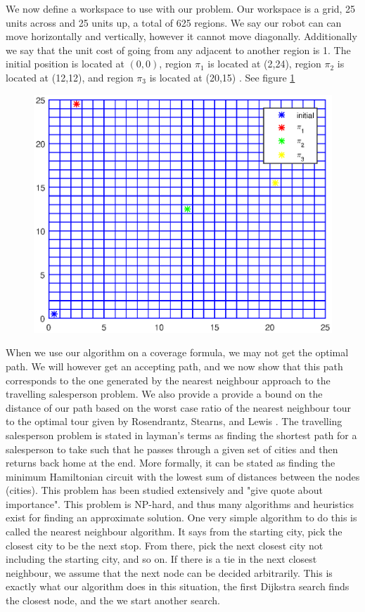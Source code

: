 We now define a workspace to use with our problem. Our workspace is a grid, 25 units across and 25 units up, a total of 625 regions. We say our robot can can move horizontally and vertically, however it cannot move diagonally. Additionally we say that the unit cost of going from any adjacent to another region is 1. The initial position is located at $(0,0)$, region $\pi_1$ is located at (2,24), region $\pi_2$ is located at (12,12), and region $\pi_3$ is located at (20,15) . See figure \ref{fig:workspace}

\begin{figure}[!htb]
\centering
\includegraphics[scale=1]{workspace.eps}
\label{fig:workspace}
\end{figure}


When we use our algorithm on a coverage formula, we may not get the optimal path. We will however get an accepting path, and we now show that this path corresponds to the one generated by the nearest neighbour approach to the travelling salesperson problem. We also provide a provide a bound on the distance of our path based on the worst case ratio of the nearest neighbour tour to the optimal tour given by Rosendrantz, Stearns, and Lewis \cite{rosenkrantz74}. The travelling salesperson problem is stated in layman's terms as finding the shortest path for a salesperson to take such that he passes through a given set of cities and then returns back home at the end. More formally, it can be stated as finding the minimum Hamiltonian circuit with the lowest sum of distances between the nodes (cities). This problem has been studied extensively and "give quote about importance". This problem is NP-hard, and thus many algorithms and heuristics exist for finding an approximate solution. One very simple algorithm to do this is called the nearest neighbour algorithm. It says from the starting city, pick the closest city to be the next stop. From there, pick the next closest city not including the starting city, and so on. If there is a tie in the next closest neighbour, we assume that the next node can be decided arbitrarily. This is exactly what our algorithm does in this situation, the first Dijkstra search finds the closest node, and the we start another search. 

